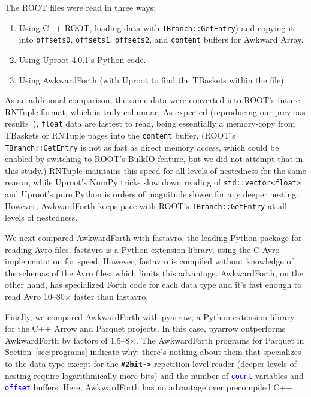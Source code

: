 \documentclass{webofc}
\begin{document}
The ROOT files were read in three ways:
\begin{enumerate}
\item Using C++ ROOT, loading data with \texttt{TBranch::GetEntry}) and copying it into \texttt{offsets0}, \texttt{offsets1}, \texttt{offsets2}, and \texttt{content} buffers for Awkward Array.
\item Using Uproot 4.0.1's Python code.
\item Using AwkwardForth (with Uproot to find the TBaskets within the file).
\end{enumerate}

\noindent As an additional comparison, the same data were converted into ROOT's future RNTuple format, which is truly columnar. As expected (reproducing our previous results~\cite{chep2019}), \texttt{float} data are fastest to read, being essentially a memory-copy from TBaskets or RNTuple pages into the \texttt{content} buffer. (ROOT's \texttt{TBranch::GetEntry} is not as fast as direct memory access, which could be enabled by switching to ROOT's BulkIO feature, but we did not attempt that in this study.) RNTuple maintains this speed for all levels of nestedness for the same reason, while Uproot's NumPy tricks slow down reading of \texttt{std::vector<float>} and Uproot's pure Python is orders of magnitude slower for any deeper nesting. However, AwkwardForth keeps pace with ROOT's \texttt{TBranch::GetEntry} at all levels of nestedness.

We next compared AwkwardForth with fastavro, the leading Python package for reading Avro files. fastavro is a Python extension library, using the C Avro implementation for speed. However, fastavro is compiled without knowledge of the schemas of the Avro files, which limits this advantage. AwkwardForth, on the other hand, has specialized Forth code for each data type and it's fast enough to read Avro 10--80$\times$ faster than fastavro.

Finally, we compared AwkwardForth with pyarrow, a Python extension library for the C++ Arrow and Parquet projects. In this case, pyarrow outperforms AwkwardForth by factors of 1.5--8$\times$. The AwkwardForth programs for Parquet in Section~\ref{sec:programs} indicate why: there's nothing about them that specializes to the data type except for the \textcolor{OliveGreen}{\tt\textbf{\#2bit->}} repetition level reader (deeper levels of nesting require logarithmically more bits) and the number of \textcolor{blue}{\tt count} variables and \textcolor{blue}{\tt offset} buffers. Here, AwkwardForth has no advantage over precompiled C++.
\end{document}
